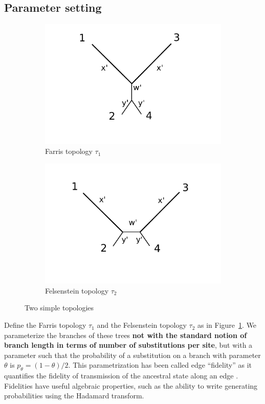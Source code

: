 \documentclass{article}
\begin{document}
\subsection{Parameter setting}

\begin{figure}
\centering
\begin{subfigure}{.45\linewidth}
\centering
\includegraphics[width=.95\textwidth]{farris_blank}
\caption[short]{Farris topology $\tau_1$}
\end{subfigure}
\begin{subfigure}{.45\linewidth}
\centering
\includegraphics[width=.95\textwidth]{felsenstein_blank}
\caption[short]{Felsenstein topology $\tau_2$}
\end{subfigure}
\caption{Two simple topologies}
\label{fig:farris-fels-top}
\end{figure}

Define the Farris topology $\tau_1$ and the Felsenstein topology $\tau_2$ as in Figure~\ref{fig:farris-fels-top}.
We parameterize the branches of these trees \textbf{not with the standard notion of branch length in terms of number of substitutions per site}, but with a parameter such that the probability of a substitution on a branch with parameter $\theta$ is $p_\theta = (1-\theta)/2$.
This parametrization has been called edge ``fidelity'' as it quantifies the fidelity of transmission of the ancestral state along an edge \cite{Matsen2007-jq}.
Fidelities have useful algebraic properties, such as the ability to write generating probabilities using the Hadamard transform.
\end{document}
